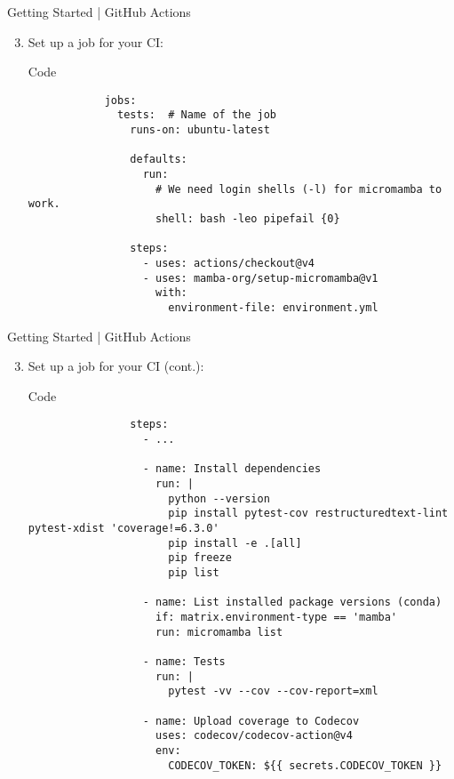 \begin{frame}[fragile]{Getting Started | GitHub Actions}
  \begin{enumerate}
      \setcounter{enumi}{2}
      \item Set up a job for your CI:
        \begin{block}{Code}
          \begin{verbatim}
            jobs:
              tests:  # Name of the job
                runs-on: ubuntu-latest

                defaults:
                  run:
                    # We need login shells (-l) for micromamba to work.
                    shell: bash -leo pipefail {0}

                steps:
                  - uses: actions/checkout@v4
                  - uses: mamba-org/setup-micromamba@v1
                    with:
                      environment-file: environment.yml
          \end{verbatim}
        \end{block}
    \end{enumerate}
\end{frame}

\begin{frame}[fragile]{Getting Started | GitHub Actions}
  \begin{enumerate}
      \setcounter{enumi}{2}
    \item Set up a job for your CI (cont.):
        \begin{block}{Code}
          \footnotesize
          \begin{verbatim}
                steps:
                  - ...

                  - name: Install dependencies
                    run: |
                      python --version
                      pip install pytest-cov restructuredtext-lint pytest-xdist 'coverage!=6.3.0'
                      pip install -e .[all]
                      pip freeze
                      pip list

                  - name: List installed package versions (conda)
                    if: matrix.environment-type == 'mamba'
                    run: micromamba list

                  - name: Tests
                    run: |
                      pytest -vv --cov --cov-report=xml

                  - name: Upload coverage to Codecov
                    uses: codecov/codecov-action@v4
                    env:
                      CODECOV_TOKEN: ${{ secrets.CODECOV_TOKEN }}
          \end{verbatim}
        \end{block}
    \end{enumerate}
\end{frame}

